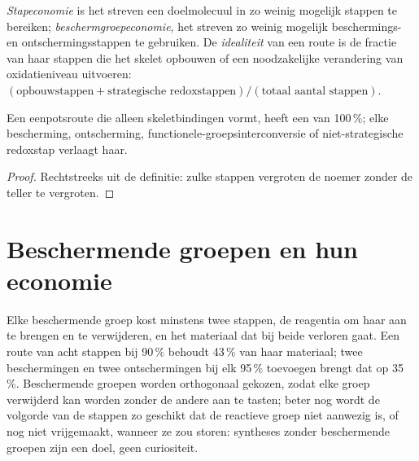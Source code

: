 \begin{definition}\label{def:b3:total-synthesis:economy}
\emph{Stapeconomie} is het streven een doelmolecuul in
zo weinig mogelijk stappen te bereiken;
\emph{beschermgroepeconomie}, het streven zo
weinig mogelijk beschermings- en ontschermingsstappen te gebruiken. De
\emph{idealiteit} van een route is de fractie van haar
stappen die het skelet opbouwen of een noodzakelijke verandering van
oxidatieniveau uitvoeren:
$(\text{opbouwstappen} + \text{strategische redoxstappen})/(\text{totaal aantal stappen})$.
\end{definition}

\begin{proposition}\label{prop:b3:total-synthesis:ideality}
Een eenpotsroute die alleen skeletbindingen vormt, heeft een 
van 100\,\%; elke bescherming, ontscherming,
functionele-groepsinterconversie of niet-strategische redoxstap
verlaagt haar.
\end{proposition}

\begin{proof}
Rechtstreeks uit de definitie: zulke stappen vergroten de noemer zonder
de teller te vergroten.
\end{proof}

\section{Beschermende groepen en hun economie}

Elke beschermende groep kost minstens twee stappen, de reagentia om haar
aan te brengen en te verwijderen, en het materiaal dat bij beide verloren
gaat. Een route van acht stappen bij 90\,\% behoudt 43\,\% van haar
materiaal; twee beschermingen en twee ontschermingen bij elk 95\,\%
toevoegen brengt dat op 35\,\%. Beschermende groepen worden orthogonaal
gekozen, zodat elke groep verwijderd kan worden zonder de andere aan te
tasten; beter nog wordt de volgorde van de stappen zo geschikt dat de
reactieve groep niet aanwezig is, of nog niet vrijgemaakt, wanneer ze
zou storen: syntheses zonder beschermende groepen zijn een doel, geen
curiositeit.

